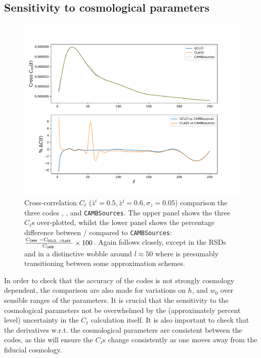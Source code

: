 \subsection{Sensitivity to cosmological parameters} \label{App_accuracy}
\begin{figure}
\begin{center}
\includegraphics[width=\textwidth]{BOSS-FIGS/PrecCross.pdf}
\caption[Code comparison between \uclcl, \class, and \texttt{CAMBSources} for the cross-$C_{\ell}$s calculation.]{Cross-correlation $C_{\ell}$ ($\bar z^i = 0.5, \bar z^j = 0.6, \sigma_z = 0.05$) comparison the three codes \uclcl, \class, and \texttt{CAMBSources}. The upper panel shows the three $C_{\ell}$s over-plotted, whilst the lower panel shows the percentage difference between \uclcl / \class compared to \texttt{CAMBSources}: $\frac{C_{\texttt{CAMB }}-C_{\texttt{UCLCL } / \texttt{CLASS }}}{C_{\texttt{CAMB }}}\times 100$. Again \uclcl follows \class closely, except in the RSDs and in a distinctive wobble around $l \approx 50$ where \class is presumably transitioning between some approximation schemes.}
\label{fig:Cross_Precision}
\end{center}
\end{figure}
In order to check that the accuracy of the codes is not strongly cosmology dependent, the comparison are also made for variations on $h$, and $w_0$ over sensible ranges of the parameters. It is crucial that the sensitivity to the cosmological parameters not be overwhelmed by the (approximately percent level) uncertainty in the $C_{\ell}$ calculation itself. It is also important to check that the derivatives w.r.t. the cosmological parameters are consistent between the codes, as this will ensure the $C_{\ell}$s change consistently as one moves away from the fiducial cosmology.

